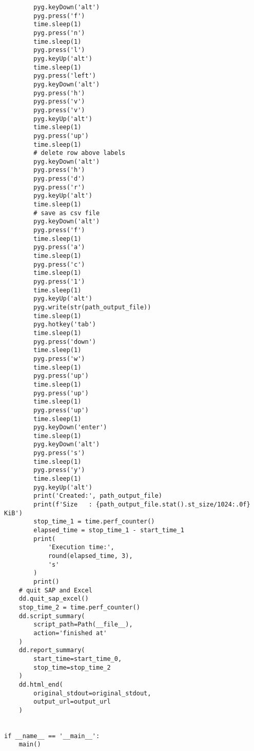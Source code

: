 \documentclass[10pt, letterpaper, twoside]{article}
\begin{document}
\begin{footnotesize}
\begin{verbatim}
        pyg.keyDown('alt')
        pyg.press('f')
        time.sleep(1)
        pyg.press('n')
        time.sleep(1)
        pyg.press('l')
        pyg.keyUp('alt')
        time.sleep(1)
        pyg.press('left')
        pyg.keyDown('alt')
        pyg.press('h')
        pyg.press('v')
        pyg.press('v')
        pyg.keyUp('alt')
        time.sleep(1)
        pyg.press('up')
        time.sleep(1)
        # delete row above labels
        pyg.keyDown('alt')
        pyg.press('h')
        pyg.press('d')
        pyg.press('r')
        pyg.keyUp('alt')
        time.sleep(1)
        # save as csv file
        pyg.keyDown('alt')
        pyg.press('f')
        time.sleep(1)
        pyg.press('a')
        time.sleep(1)
        pyg.press('c')
        time.sleep(1)
        pyg.press('1')
        time.sleep(1)
        pyg.keyUp('alt')
        pyg.write(str(path_output_file))
        time.sleep(1)
        pyg.hotkey('tab')
        time.sleep(1)
        pyg.press('down')
        time.sleep(1)
        pyg.press('w')
        time.sleep(1)
        pyg.press('up')
        time.sleep(1)
        pyg.press('up')
        time.sleep(1)
        pyg.press('up')
        time.sleep(1)
        pyg.keyDown('enter')
        time.sleep(1)
        pyg.keyDown('alt')
        pyg.press('s')
        time.sleep(1)
        pyg.press('y')
        time.sleep(1)
        pyg.keyUp('alt')
        print('Created:', path_output_file)
        print(f'Size   : {path_output_file.stat().st_size/1024:.0f} KiB')
        stop_time_1 = time.perf_counter()
        elapsed_time = stop_time_1 - start_time_1
        print(
            'Execution time:',
            round(elapsed_time, 3),
            's'
        )
        print()
    # quit SAP and Excel
    dd.quit_sap_excel()
    stop_time_2 = time.perf_counter()
    dd.script_summary(
        script_path=Path(__file__),
        action='finished at'
    )
    dd.report_summary(
        start_time=start_time_0,
        stop_time=stop_time_2
    )
    dd.html_end(
        original_stdout=original_stdout,
        output_url=output_url
    )


if __name__ == '__main__':
    main()
\end{verbatim}
\end{footnotesize}
\end{document}
